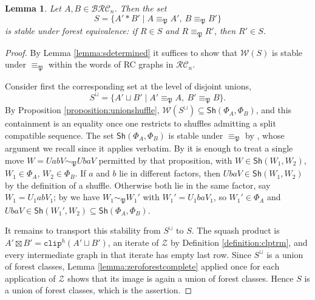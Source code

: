 \documentclass{amsart}
\newtheorem{lemma}{Lemma}[subsection]
\theoremstyle{definition}
\theoremstyle{remark}
\numberwithin{equation}{subsection}
\newcommand{\zeromap}{\mathcal{Z}}
\newcommand{\clp}{\mathtt{clip}}
\newcommand{\BRC}{\mathcal{BRC}}
\newcommand{\RC}{\mathcal{RC}}
\newcommand{\forest}{\mathfrak{P}}
\begin{document}
\begin{lemma}\label{lemma:foreststable}
Let $A,B\in\BRC_n$. Then the set
$$S=\{A'*B'\mid A\equiv_\forest A',\ B\equiv_\forest B'\}$$
is stable under forest equivalence: if $R\in S$ and $R\equiv_\forest R'$, then $R'\in S$.
\end{lemma}
\begin{proof}
By Lemma \ref{lemma:sdetermined} it suffices to show that $\mathcal{W}(S)$ is stable under $\equiv_\forest$ within the words of RC graphs in $\RC_n$.

Consider first the corresponding set at the level of disjoint unions,
$$S^{\sqcup}=\{A'\sqcup B'\mid A'\equiv_\forest A,\ B'\equiv_\forest B\}.$$
By Proposition \ref{proposition:unionshuffle}, $\mathcal{W}(S^{\sqcup})\subseteq\mathsf{Sh}(\Phi_A,\Phi_B)$, and this containment is an equality once one restricts to shuffles admitting a split compatible sequence. The set $\mathsf{Sh}(\Phi_A,\Phi_B)$ is stable under $\equiv_\forest$ by \cite[Theorem~6.3]{nadeau2024forest}, whose argument we recall since it applies verbatim. By \cite[Proposition~5.8]{nadeau2024forest} it is enough to treat a single move $W=UabV\sim_\forest UbaV$ permitted by that proposition, with $W\in\mathsf{Sh}(W_1,W_2)$, $W_1\in\Phi_A$, $W_2\in\Phi_B$. If $a$ and $b$ lie in different factors, then $UbaV\in\mathsf{Sh}(W_1,W_2)$ by the definition of a shuffle. Otherwise both lie in the same factor, say $W_1=U_1abV_1$; by \cite[Lemma~5.9]{nadeau2024forest} we have $W_1\sim_\forest W_1'$ with $W_1'=U_1baV_1$, so $W_1'\in\Phi_A$ and $UbaV\in\mathsf{Sh}(W_1',W_2)\subseteq\mathsf{Sh}(\Phi_A,\Phi_B)$.

It remains to transport this stability from $S^{\sqcup}$ to $S$. The squash product is $A'\boxtimes B'=\clp^{h}(A'\sqcup B')$, an iterate of $\zeromap$ by Definition \ref{definition:clptrm}, and every intermediate graph in that iterate has empty last row. Since $S^{\sqcup}$ is a union of forest classes, Lemma \ref{lemma:zeroforestcomplete} applied once for each application of $\zeromap$ shows that its image is again a union of forest classes. Hence $S$ is a union of forest classes, which is the assertion.
\end{proof}
\end{document}
